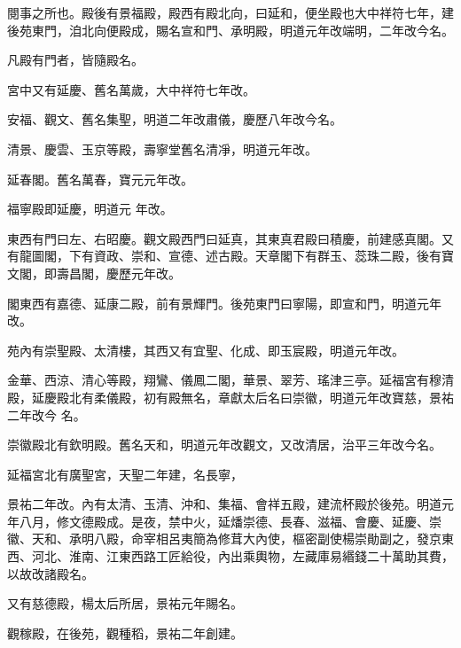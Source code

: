 \begin{pinyinscope}
 閱事之所也。殿後有景福殿，殿西有殿北向，曰延和，便坐殿也大中祥符七年，建後苑東門，洎北向便殿成，賜名宣和門、承明殿，明道元年改端明，二年改今名。



 凡殿有門者，皆隨殿名。



 宮中又有延慶、舊名萬歲，大中祥符七年改。



 安福、觀文、舊名集聖，明道二年改肅儀，慶歷八年改今名。



 清景、慶雲、玉京等殿，壽寧堂舊名清凈，明道元年改。



 延春閣。舊名萬春，寶元元年改。



 福寧殿即延慶，明道元
 年改。



 東西有門曰左、右昭慶。觀文殿西門曰延真，其東真君殿曰積慶，前建感真閣。又有龍圖閣，下有資政、崇和、宣德、述古殿。天章閣下有群玉、蕊珠二殿，後有寶文閣，即壽昌閣，慶歷元年改。



 閣東西有嘉德、延康二殿，前有景輝門。後苑東門曰寧陽，即宣和門，明道元年改。



 苑內有崇聖殿、太清樓，其西又有宜聖、化成、即玉宸殿，明道元年改。



 金華、西涼、清心等殿，翔鸞、儀鳳二閣，華景、翠芳、瑤津三亭。延福宮有穆清殿，延慶殿北有柔儀殿，初有殿無名，章獻太后名曰崇徽，明道元年改寶慈，景祐二年改今
 名。



 崇徽殿北有欽明殿。舊名天和，明道元年改觀文，又改清居，治平三年改今名。



 延福宮北有廣聖宮，天聖二年建，名長寧，



 景祐二年改。內有太清、玉清、沖和、集福、會祥五殿，建流杯殿於後苑。明道元年八月，修文德殿成。是夜，禁中火，延燔崇德、長春、滋福、會慶、延慶、崇徽、天和、承明八殿，命宰相呂夷簡為修茸大內使，樞密副使楊崇勛副之，發京東西、河北、淮南、江東西路工匠給役，內出乘輿物，左藏庫易緡錢二十萬助其費，以故改諸殿名。



 又有慈德殿，楊太后所居，景祐元年賜名。



 觀稼殿，在後苑，觀種稻，景祐二年創建。




\end{pinyinscope}
